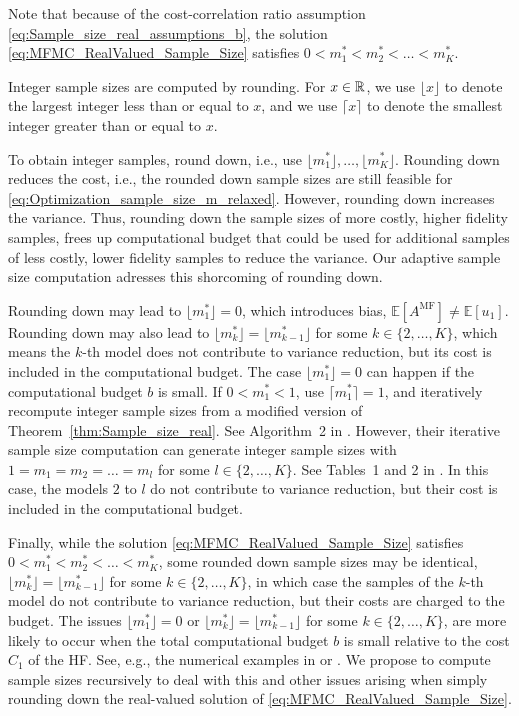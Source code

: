 Note that because of the cost-correlation ratio assumption \eqref{eq:Sample_size_real_assumptions_b}, 
the  solution \eqref{eq:MFMC_RealValued_Sample_Size}
satisfies $0  < m_1^* < m_2^* <  \ldots < m_K^*$.


Integer sample sizes are computed by rounding.
For $x \in \mathbb{R}$, we use $\lfloor x \rfloor$ to denote the largest integer less than or equal to $x$,
and we use $\lceil x \rceil$ to denote the smallest integer greater than or equal to $x$.

To obtain integer samples,  \cite[p.~A3171]{BPeherstorfer_KWillcox_MDGunzburger_2016a}
round down, i.e., use $\lfloor m_1^* \rfloor, \ldots, \lfloor m_K^* \rfloor$. 
Rounding down reduces the cost, i.e., the rounded down sample sizes are still feasible for
\eqref{eq:Optimization_sample_size_m_relaxed}.  However, rounding down increases the variance.
Thus, rounding down the sample sizes of more costly, higher fidelity samples, frees up computational 
budget that could be used for additional samples of less costly, lower fidelity samples to reduce the variance.
Our adaptive sample size computation adresses this shorcoming of rounding down.

Rounding down may lead to $\lfloor m_1^* \rfloor = 0$, which introduces bias,  
$\mathbb{E}[A^{\text{MF}}] \not=  \mathbb{E}[u_1]$.
Rounding down may also lead to $\lfloor m_k^* \rfloor = \lfloor m_{k-1}^* \rfloor$ for some $k \in \{ 2, \ldots, K\}$, 
which means the $k$-th model does not contribute to variance reduction, but its cost is included in the
computational budget.
The case $\lfloor m_1^* \rfloor = 0$ can happen if the computational budget $b$ is small.
If $0< m_1^* < 1$, \cite{AGruber_MGunzburger_LJu_ZWang_2023a} use $\lceil m_1^* \rceil = 1$,
and iteratively recompute integer sample sizes from a modified version of 
Theorem~\ref{thm:Sample_size_real}. See Algorithm~2 in \cite{AGruber_MGunzburger_LJu_ZWang_2023a}.
However, their iterative sample size computation can generate integer sample sizes
with $1 = m_1 =  m_2 = \ldots = m_l$ for some $l \in \{ 2, \ldots, K\}$. 
See Tables~1 and 2 in \cite{AGruber_MGunzburger_LJu_ZWang_2023a}.
In this case, the models $2$ to $l$ do not contribute to variance reduction, but their cost is included in the
computational budget.

Finally, while the  solution \eqref{eq:MFMC_RealValued_Sample_Size} satisfies $0  < m_1^* < m_2^* <  \ldots < m_K^*$,
some rounded down sample sizes may be identical,  $\lfloor m_k^* \rfloor = \lfloor m_{k-1}^* \rfloor$ for some 
$k \in \{ 2, \ldots, K\}$, in which case the samples of the $k$-th model do not contribute to variance
reduction, but their costs are charged to the budget. 
The issues $\lfloor m_1^* \rfloor = 0$ or $\lfloor m_k^* \rfloor = \lfloor m_{k-1}^* \rfloor$ for some 
$k \in \{ 2, \ldots, K\}$, are more likely to occur when the total computational budget $b$ is small relative
 to the cost $C_1$ of the HF.
See, e.g., the numerical examples in  \cite{BPeherstorfer_KWillcox_MDGunzburger_2016a} or \cite{AGruber_MGunzburger_LJu_ZWang_2023a}.
We propose to compute sample sizes recursively to deal with this and other issues arising when simply
rounding down the real-valued solution of \eqref{eq:MFMC_RealValued_Sample_Size}.



